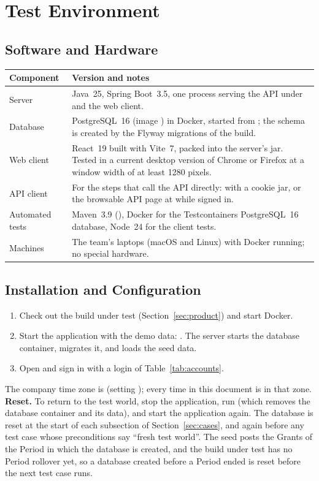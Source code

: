 \section{Test Environment}\label{sec:env}

\subsection{Software and Hardware}
\begin{tabularx}{\textwidth}{@{}L{3.4cm}Y@{}}
\toprule
\textbf{Component} & \textbf{Version and notes} \\
\midrule
Server & Java~25, Spring Boot~3.5, one process serving the API under  and the web client. \\
Database & PostgreSQL~16 (image ) in Docker, started from ; the schema is created by the Flyway migrations of the build. \\
Web client & React~19 built with Vite~7, packed into the server's jar. Tested in a current desktop version of Chrome or Firefox at a window width of at least 1280 pixels. \\
API client & For the steps that call the API directly:  with a cookie jar, or the browsable API page at  while signed in. \\
Automated tests & Maven~3.9 (), Docker for the Testcontainers PostgreSQL~16 database, Node~24 for the client tests. \\
Machines & The team's laptops (macOS and Linux) with Docker running; no special hardware. \\
\bottomrule
\end{tabularx}

\subsection{Installation and Configuration}\label{sec:install}
\begin{enumerate}
  \item Check out the build under test (Section~\ref{sec:product}) and start Docker.
  \item Start the application with the demo data: . The server starts the database container, migrates it, and loads the seed data.
  \item Open  and sign in with a login of Table~\ref{tab:accounts}.
\end{enumerate}
The company time zone is  (setting ); every time in this document is in that zone. \textbf{Reset.} To return to the test world, stop the application, run  (which removes the database container and its data), and start the application again. The database is reset at the start of each subsection of Section~\ref{sec:cases}, and again before any test case whose preconditions say ``fresh test world''. The seed posts the Grants of the Period in which the database is created, and the build under test has no Period rollover yet, so a database created before a Period ended is reset before the next test case runs.

